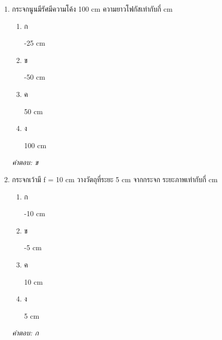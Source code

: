 \documentclass[12pt]{article}
\begin{document}
\begin{enumerate}[label=\arabic*., itemsep=0.5\baselineskip, topsep=0.5\baselineskip, leftmargin=*]
\item กระจกนูนมีรัศมีความโค้ง 100 cm ความยาวโฟกัสเท่ากับกี่ cm
\begin{enumerate}[label=\alph*)., itemsep=0.3\baselineskip, topsep=0.3\baselineskip]
\item ก\ 
\begin{minipage}[t]{0.9\linewidth}
\raggedright -25 cm
\end{minipage}
\item ข\ 
\begin{minipage}[t]{0.9\linewidth}
\raggedright -50 cm
\end{minipage}
\item ค\ 
\begin{minipage}[t]{0.9\linewidth}
\raggedright 50 cm
\end{minipage}
\item ง\ 
\begin{minipage}[t]{0.9\linewidth}
\raggedright 100 cm
\end{minipage}
\end{enumerate}
\vspace{-0.3\baselineskip}
\begin{small}
\textit{คำตอบ: ข}
\end{small}

\item กระจกเว้ามี f = 10 cm วางวัตถุที่ระยะ 5 cm จากกระจก ระยะภาพเท่ากับกี่ cm
\begin{enumerate}[label=\alph*)., itemsep=0.3\baselineskip, topsep=0.3\baselineskip]
\item ก\ 
\begin{minipage}[t]{0.9\linewidth}
\raggedright -10 cm
\end{minipage}
\item ข\ 
\begin{minipage}[t]{0.9\linewidth}
\raggedright -5 cm
\end{minipage}
\item ค\ 
\begin{minipage}[t]{0.9\linewidth}
\raggedright 10 cm
\end{minipage}
\item ง\ 
\begin{minipage}[t]{0.9\linewidth}
\raggedright 5 cm
\end{minipage}
\end{enumerate}
\vspace{-0.3\baselineskip}
\begin{small}
\textit{คำตอบ: ก}
\end{small}


\end{enumerate}
\end{document}
